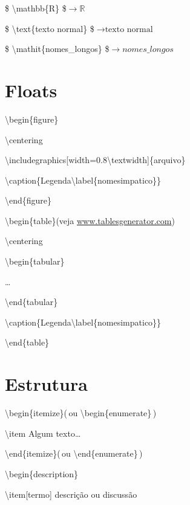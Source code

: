 \documentclass[11pt,twoside,english,brazilian]{article}
\begin{document}
\begin{multicols}{3}
\$ \textbackslash{}mathbb\{R\} \$\enspace $\rightarrow \mathbb{R}$

\$ \textbackslash{}text\{texto normal\} \$\enspace $\rightarrow \text{texto normal}$

\$ \textbackslash{}mathit\{nomes\_longos\} \$\enspace $\rightarrow \mathit{nomes\_longos}$


\section*{Floats}

\textbackslash{}begin\{figure\}

\quad\textbackslash{}centering

\quad\textbackslash{}includegraphics[width=0.8\textbackslash{}textwidth]\{arquivo\}

\quad\textbackslash{}caption\{Legenda\textbackslash{}label\{nomesimpatico\}\}

\textbackslash{}end\{figure\}


\vspace{\baselineskip}


\textbackslash{}begin\{table\}\quad (veja \url{www.tablesgenerator.com})

\quad\textbackslash{}centering

\quad\textbackslash{}begin\{tabular\}

\quad\quad\dots

\quad\textbackslash{}end\{tabular\}

\quad\textbackslash{}caption\{Legenda\textbackslash{}label\{nomesimpatico\}\}

\textbackslash{}end\{table\}

\columnbreak


\section*{Estrutura}

\textbackslash{}begin\{itemize\}\quad (\,ou \textbackslash{}begin\{enumerate\}\,)

\quad\textbackslash{}item Algum texto\dots

\textbackslash{}end\{itemize\}\quad (\,ou \textbackslash{}end\{enumerate\}\,)


\vspace{\baselineskip}


\textbackslash{}begin\{description\}

\quad\textbackslash{}item[termo] descrição ou discussão


\end{multicols}
\end{document}
